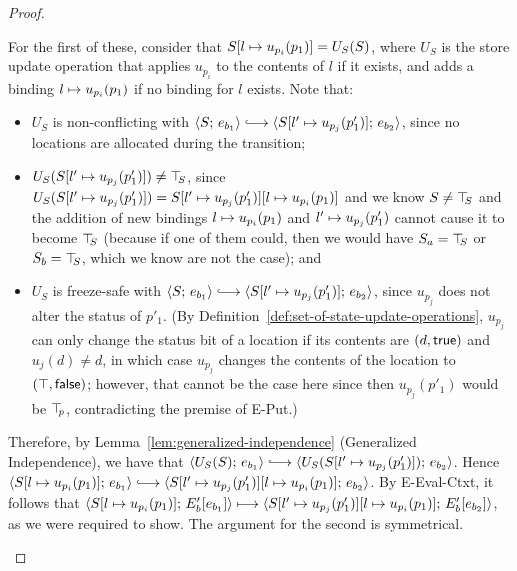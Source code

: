 \begin{proof}
\begin{enumerate}
\begin{enumerate}
\begin{itemize}
          For the first of these, consider that
          $S[l \mapsto u_{p_i}(p_1)] = U_S(S)$, where $U_S$ is the
          store update operation that applies $u_{p_i}$ to the
          contents of $l$ if it exists, and adds a binding
          $l \mapsto u_{p_i}(p_1)$ if no binding for $l$
          exists.  Note that:
          \begin{itemize}
          \item $U_S$ is non-conflicting with $\config{S}{e_{b_1}}
            \parstepsto
            \config{\extSRaw{S}{l'}{u_{p_j}(p'_1)}}{e_{b_2}}$, since
            no locations are allocated during the transition;
          \item $U_S(S[l' \mapsto u_{p_j}(p'_1)]) \neq \top\hspace{-0.85mm}_{S}$,
            since $U_S(S[l' \mapsto u_{p_j}(p'_1)]) =
            S[l' \mapsto u_{p_j}(p'_1)][l \mapsto u_{p_i}(p_1)]$
            and we know $S \neq \top\hspace{-0.85mm}_{S}$ and the addition of new
            bindings $l \mapsto u_{p_i}(p_1)$ and
            $l' \mapsto u_{p_j}(p'_1)$ cannot cause it to
            become $\top\hspace{-0.85mm}_{S}$ (because if one of them could, then we
            would have $S_a = \top\hspace{-0.85mm}_{S}$ or $S_b = \top\hspace{-0.85mm}_{S}$, which we know
            are not the case); and
          \item $U_S$ is freeze-safe with $\config{S}{e_{b_1}}
            \parstepsto
            \config{\extSRaw{S}{l'}{u_{p_j}(p'_1)}}{e_{b_2}}$, since
            $u_{p_j}$ does not alter the status of $p'_1$.  (By
            Definition~\ref{def:set-of-state-update-operations},
            $u_{p_j}$ can only change the status bit of a location if
            its contents are $(d, \textsf{true})$ and $u_j(d) \neq
            d$, in which case $u_{p_j}$ changes the contents of the
            location to $(\top, \textsf{false})$; however, that
            cannot be the case here since then $u_{p_j}(p'_1)$ would be
            $\top\hspace{-0.85mm}_{p}$, contradicting the premise of {\sc E-Put}.)
          \end{itemize}

          Therefore, by Lemma~\ref{lem:generalized-independence}
          (Generalized Independence), we have that
          $\config{U_S(S)}{e_{b_1}} \parstepsto
          \config{U_S(\extSRaw{S}{l'}{u_{p_j}(p'_1)})}{e_{b_2}}$.
          Hence $\config{\extSRaw{S}{l}{u_{p_i}(p_1)}}{e_{b_1}}
          \parstepsto
          \config{\extSRaw{\extSRaw{S}{l'}{u_{p_j}(p'_1)}}{l}{u_{p_i}(p_1)}}{e_{b_2}}$.
          By {\sc E-Eval-Ctxt}, it follows that
          $\langle S[l \mapsto u_{p_i}(p_1)];\, E'_b\hspace{-0.5mm}\left[e_{b_1}\right] \rangle
          \longmapsto
          \langle S[l' \mapsto u_{p_j}(p'_1)][l \mapsto u_{p_i}(p_1)];\, E'_b\hspace{-0.5mm}\left[e_{b_2}\right] \rangle$,
          as we were required to show.  The argument for the second is
          symmetrical.


\end{itemize}
\end{enumerate}
\end{enumerate}
\end{proof}
